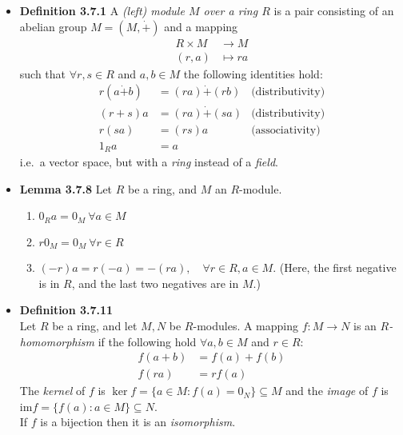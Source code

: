 \documentclass[11pt,a4paper]{article}
\begin{document}
\begin{itemize}

    \item \textbf{Definition 3.7.1}
        A \emph{(left) module $M$ over a ring $R$} is a pair consisting of an abelian group
        $M = (M, \dot{+})$ and a mapping
        \begin{align*}{}
            R \times M & \to M \\
            (r,a)      & \mapsto ra
        \end{align*}
        such that $\forall r,s \in R$ and $a,b \in M$ the following identities hold:
        \begin{align*}{}
            r(a \dot{+} b) & = (ra) \dot{+} (rb) & \text{(distributivity)} \\
            (r+s)a         & = (ra) \dot{+} (sa) & \text{(distributivity)}\\
            r(sa)          & = (rs)a             & \text{(associativity)}\\
            {1_R}a         & = a
        \end{align*}
        i.e.\ a vector space, but with a \emph{ring} instead of a \emph{field}.

    \item \textbf{Lemma 3.7.8} Let $R$ be a ring, and $M$ an $R$-module.
        \begin{enumerate}
            \item ${0_R}a = 0_M \ \forall a \in M$
            \item $r{0_M} = 0_M \ \forall r \in R$
            \item $(-r)a = r(-a) = -(ra), \quad \forall r \in R, a \in M$.
                (Here, the first negative is in $R$, and the last two negatives are in $M$.)
        \end{enumerate}

    \item \textbf{Definition 3.7.11} \\
        Let $R$ be a ring, and let $M,N$ be $R$-modules.
        A mapping $f : M \to N$ is an \emph{$R$-homomorphism} if the following hold
        $\forall a,b \in M$ and $r \in R$:
        \begin{align*}{}
            f(a+b) & = f(a) + f(b) \\
            f(ra)  & = rf(a)
        \end{align*}
        The \emph{kernel} of $f$ is $\ker f = \{a\in M : f(a) = 0_N \} \subseteq M$
        and the \emph{image} of $f$ is $\mathrm{im} f = \{f(a) : a \in M\} \subseteq N$. \\
        If $f$ is a bijection then it is an \emph{isomorphism}.


\end{itemize}
\end{document}
